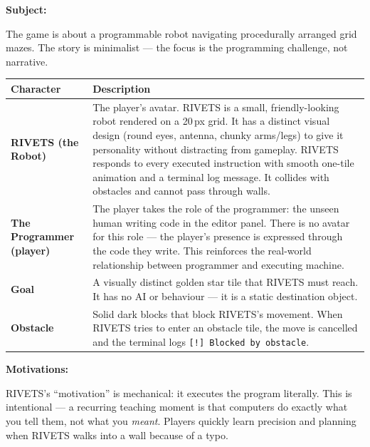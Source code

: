 \documentclass[12pt,a4paper]{article}
\newcommand{\gddfield}[2]{%
  \noindent\begin{minipage}[t]{3.5cm}\bfseries\color{accent}\sffamily#1\end{minipage}%
  \hspace{8pt}%
  \begin{minipage}[t]{\dimexpr\linewidth-3.5cm-8pt\relax}%
    #2
  \end{minipage}\par\smallskip}
\begin{document}
\vspace{6pt}

\begin{tcolorbox}[gddbox, title={Characters / Roles}]
\gddfield{Subject:}{The game is about a programmable robot navigating procedurally arranged grid mazes. The story is minimalist — the focus is the programming challenge, not narrative.}

\vspace{4pt}
\begin{tabularx}{\linewidth}{>{\bfseries\color{accent}\sffamily}p{3cm} X}
  \toprule
  Character & Description \\
  \midrule
  \textbf{RIVETS} (the Robot) &
    The player's avatar. RIVETS is a small, friendly-looking robot rendered on a 20\,px grid. It has a distinct visual design (round eyes, antenna, chunky arms/legs) to give it personality without distracting from gameplay. RIVETS responds to every executed instruction with smooth one-tile animation and a terminal log message. It collides with obstacles and cannot pass through walls. \\[6pt]
  \textbf{The Programmer} (player) &
    The player takes the role of the programmer: the unseen human writing code in the editor panel. There is no avatar for this role — the player's presence is expressed through the code they write. This reinforces the real-world relationship between programmer and executing machine. \\[6pt]
  \textbf{Goal} &
    A visually distinct golden star tile that RIVETS must reach. It has no AI or behaviour — it is a static destination object. \\[6pt]
  \textbf{Obstacle} &
    Solid dark blocks that block RIVETS's movement. When RIVETS tries to enter an obstacle tile, the move is cancelled and the terminal logs \texttt{[!] Blocked by obstacle}. \\
  \bottomrule
\end{tabularx}

\vspace{4pt}
\gddfield{Motivations:}{%
RIVETS's ``motivation'' is mechanical: it executes the program literally. This is intentional — a recurring teaching moment is that computers do exactly what you tell them, not what you \emph{meant}. Players quickly learn precision and planning when RIVETS walks into a wall because of a typo.
}
\end{tcolorbox}

\vspace{6pt}
\end{document}
